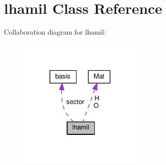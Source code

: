 \hypertarget{classlhamil}{}\section{lhamil Class Reference}
\label{classlhamil}


Collaboration diagram for lhamil\+:
\nopagebreak
\begin{figure}[H]
\begin{center}
\leavevmode
\includegraphics[width=172pt]{classlhamil__coll__graph}
\end{center}
\end{figure}
